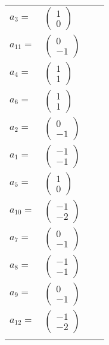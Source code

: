 \documentclass[1p]{elsarticle_modified}
\theoremstyle{definition}
\begin{document}
\begin{tabular}{m{7pt} m{180pt} m{7pt} m{180pt} }
\flushright $a_{3}=$&$\begin{pmatrix}1\\0\end{pmatrix}$ \\
\flushright $a_{11}=$&$\begin{pmatrix}0\\-1\end{pmatrix}$ \\
\flushright $a_{4}=$&$\begin{pmatrix}1\\1\end{pmatrix}$ \\
\flushright $a_{6}=$&$\begin{pmatrix}1\\1\end{pmatrix}$ \\
\flushright $a_{2}=$&$\begin{pmatrix}0\\-1\end{pmatrix}$ \\
\flushright $a_{1}=$&$\begin{pmatrix}-1\\-1\end{pmatrix}$ \\
\flushright $a_{5}=$&$\begin{pmatrix}1\\0\end{pmatrix}$ \\
\flushright $a_{10}=$&$\begin{pmatrix}-1\\-2\end{pmatrix}$ \\
\flushright $a_{7}=$&$\begin{pmatrix}0\\-1\end{pmatrix}$ \\
\flushright $a_{8}=$&$\begin{pmatrix}-1\\-1\end{pmatrix}$ \\
\flushright $a_{9}=$&$\begin{pmatrix}0\\-1\end{pmatrix}$ \\
\flushright $a_{12}=$&$\begin{pmatrix}-1\\-2\end{pmatrix}$\\&\end{tabular}
\end{document}
